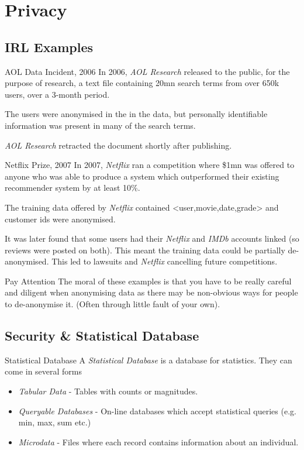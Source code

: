 \documentclass[11pt,a4paper]{article}
\begin{document}
\section{Privacy}\label{sec_privacy}

\subsection{IRL Examples}

  \begin{remark}{AOL Data Incident, 2006}
    In 2006, \textit{AOL Research} released to the public, for the purpose of research, a text file containing 20mn search terms from over 650k users, over a 3-month period.
    \par The users were anonymised in the in the data, but personally identifiable information was present in many of the search terms.
    \par \textit{AOL Research} retracted the document shortly after publishing.
  \end{remark}

  \begin{remark}{Netflix Prize, 2007}
    In 2007, \textit{Netflix} ran a competition where \$1mn was offered to anyone who was able to produce a system which outperformed their existing recommender system by at least 10\%.
    \par The training data offered by \textit{Netflix} contained <user,movie,date,grade> and customer ids were anonymised.
    \par It was later found that some users had their \textit{Netflix} and \textit{IMDb} accounts linked (so reviews were posted on both). This meant the training data could be partially de-anonymised. This led to lawsuits and \textit{Netflix} cancelling future competitions.
  \end{remark}

  \begin{remark}{Pay Attention}
    The moral of these examples is that you have to be really careful and diligent when anonymising data as there may be non-obvious ways for people to de-anonymise it. (Often through little fault of your own).
  \end{remark}

\subsection{Security \& Statistical Database}

  \begin{definition}{Statistical Database}
    A \textit{Statistical Database} is a database for statistics. They can come in several forms
    \begin{itemize}
      \item \textit{Tabular Data} - Tables with counts or magnitudes.
      \item \textit{Queryable Databases} - On-line databases which accept statistical queries (e.g. min, max, sum etc.)
      \item \textit{Microdata} - Files where each record contains information about an individual.
    \end{itemize}
  \end{definition}
\end{document}
